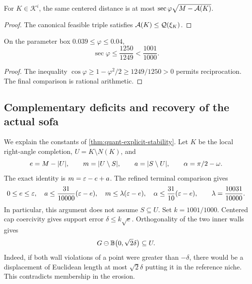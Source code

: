 \begin{corollary}
\label{cor:quant-centered-ki}
For $K\in\mathcal K^i$, the same centered distance is at most
$\sec\varphi\sqrt{M-\mathcal{A}(K)}$.
\end{corollary}
\begin{proof}
The canonical feasible triple satisfies $\mathcal{A}(K)\le\mathcal{Q}(\xi_K)$.
\end{proof}

\begin{corollary}
\label{cor:quant-centered-numeric}
On the parameter box $0.039\le\varphi\le0.04$,
\[
 \sec\varphi\le\frac{1250}{1249}<\frac{1001}{1000}.
\]
\end{corollary}
\begin{proof}
The inequality $\cos\varphi\ge1-\varphi^2/2\ge1249/1250>0$
permits reciprocation. The final comparison is rational arithmetic.
\end{proof}

\subsection{Complementary deficits and recovery of the actual sofa}
\label{sec:quant-actual-recovery}

We explain the constants of \cref{thm:quant-explicit-stability}. Let $K$ be
the local right-angle completion, $U=K\setminus N(K)$, and
\[
 e=M-\lvert U\rvert,\qquad m=\lvert U\setminus S\rvert,\qquad
 a=\lvert S\setminus U\rvert,\qquad \alpha=\pi/2-\omega.
\]
The exact identity is $m=\varepsilon-e+a$. The refined terminal comparison gives
\begin{equation}\label{eq:quant-complementary-budget}
 0\le e\le\varepsilon,\quad
 a\le\frac{31}{10000}(\varepsilon-e),\quad
 m\le\lambda(\varepsilon-e),\quad
 \alpha\le\frac{31}{10}(\varepsilon-e),\qquad
 \lambda=\frac{10031}{10000}.
\end{equation}
In particular, this argument does not assume $S\subseteq U$.
Set $k=1001/1000$. Centered cap coercivity gives support error
$\delta\le k\sqrt e$. Orthogonality of the two inner walls gives
\[
 G\ominus\mathbb B\bigl(0,\sqrt2\delta\bigr)\subseteq U.
\]
Indeed, if both wall violations of a point were greater than $-\delta$,
there would be a displacement of Euclidean length at most $\sqrt2\delta$
putting it in the reference niche. This contradicts membership in the erosion.

